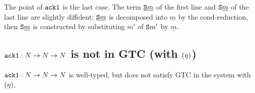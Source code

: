 \documentclass{article}
\newcommand{\Reta}{\hbox{$(\eta)$}}
\newcommand{\AckA}{{\tt ack1}}
\newcommand{\Suc}[1]{{\tt S}#1}
\newcommand{\N}{N}
\newenvironment{claim}[1][Claim]{\begin{trivlist}
\item[\hskip \labelsep {\bfseries #1}]}{\end{trivlist}}
\begin{document}
The point of $\AckA$ is the last case. The term $\underline{\Suc{m}}$ of the first line and $\Suc{\underline{m}}$ of the last line are slightly diffelent: $\underline{\Suc{m}}$ is decomposed into $\underline{m}$ by the $\text{cond}$-reduction, then $\Suc{\underline{m}}$ is constructed by substituting $m'$ of $\Suc{m'}$ by $\underline{m}$. 

\subsection{$\AckA:\N\to\N\to\N$ is not in GTC (with $\Reta$)}

\begin{claim}
  $\AckA:\N\to\N\to\N$ is well-typed, but does not satisfy GTC in the system with $\Reta$.
\end{claim}
\end{document}
